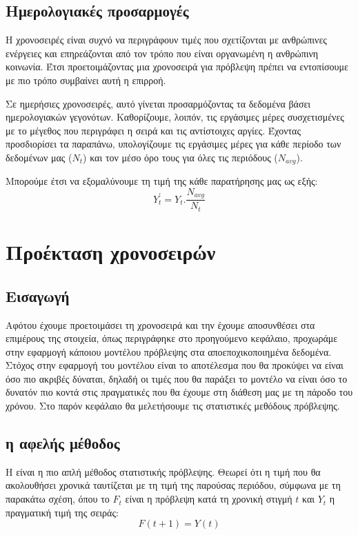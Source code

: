 \subsection{Ημερολογιακές προσαρμογές}

Η χρονοσειρές είναι συχνό να περιγράφουν τιμές που σχετίζονται με ανθρώπινες ενέργειες και επηρεάζονται από τον τρόπο που είναι οργανωμένη η ανθρώπινη κοινωνία. Έτσι προετοιμάζοντας μια χρονοσειρά για πρόβλεψη πρέπει να εντοπίσουμε με πιο τρόπο συμβαίνει αυτή η επιρροή.

Σε ημερήσιες χρονοσειρές, αυτό γίνεται προσαρμόζοντας τα δεδομένα βάσει ημερολογιακών γεγονότων. Καθορίζουμε, λοιπόν, τις εργάσιμες μέρες συσχετισμένες με το μέγεθος που περιγράφει η σειρά και τις αντίστοιχες αργίες. Έχοντας προσδιορίσει τα παραπάνω, υπολογίζουμε τις εργάσιμες μέρες για κάθε περίοδο των δεδομένων μας ($N_t$) και τον μέσο όρο τους για όλες τις περιόδους ($N_{avg}$).

Μπορούμε έτσι να εξομαλύνουμε τη τιμή της κάθε παρατήρησης μας ως εξής:
\[ Y_t^{'} = Y_t . \frac{N_{avg}}{N_t} \]

\section{Προέκταση χρονοσειρών}

\subsection{Εισαγωγή}

Αφότου έχουμε προετοιμάσει τη χρονοσειρά και την έχουμε αποσυνθέσει στα επιμέρους της στοιχεία, όπως περιγράφηκε στο προηγούμενο κεφάλαιο, προχωράμε στην εφαρμογή κάποιου μοντέλου πρόβλεψης στα αποεποχικοποιημένα δεδομένα. Στόχος στην εφαρμογή του μοντέλου είναι το αποτέλεσμα που θα προκύψει να είναι όσο πιο ακριβές δύναται, δηλαδή οι τιμές που θα παράξει το μοντέλο να είναι όσο το δυνατόν πιο κοντά στις πραγματικές που θα έχουμε στη διάθεση μας με τη πάροδο του χρόνου. Στο παρόν κεφάλαιο θα μελετήσουμε τις στατιστικές μεθόδους πρόβλεψης.

\subsection{ η αφελής μέθοδος}

H  είναι η πιο απλή μέθοδος στατιστικής πρόβλεψης. Θεωρεί ότι η τιμή που θα ακολουθήσει χρονικά ταυτίζεται με τη τιμή της παρούσας περιόδου, σύμφωνα με τη παρακάτω σχέση, όπου το $F_t$ είναι η πρόβλεψη κατά τη χρονική στιγμή $t$ και $Y_t$ η πραγματική τιμή της σειράς:
\[ F(t+1) = Y(t) \]

